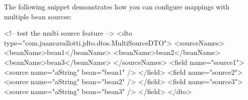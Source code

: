 \documentclass[11pt]{article}
\begin{document}
The following snippet demonstrates how you can configure mappings with multiple bean sources:

\begin{xml}
<!-- test the multi source feature -->
<dto type="com.juancavallotti.jdto.dtos.MultiSourceDTO">
    <sourceNames>
        <beanName>bean1</beanName>
        <beanName>bean2</beanName>
        <beanName>bean3</beanName>
    </sourceNames>
    <field name="source1">
        <source name="aString" bean="bean1" />
    </field>
    <field name="source2">
        <source name="aString" bean="bean2" />
    </field>
    <field name="source3">
        <source name="aString" bean="bean3" />
    </field>
</dto> 
\end{xml}
\end{document}
